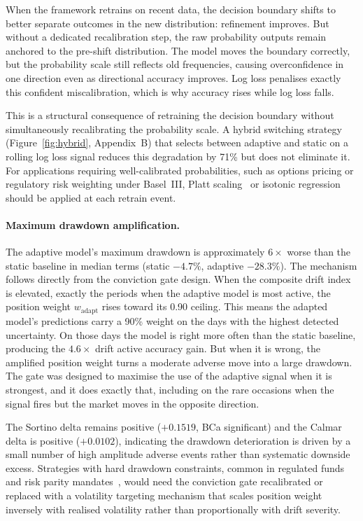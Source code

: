 When the framework retrains on recent data, the decision boundary shifts to better separate outcomes in the new distribution: refinement improves. But without a dedicated recalibration step, the raw probability outputs remain anchored to the pre-shift distribution. The model moves the boundary correctly, but the probability scale still reflects old frequencies, causing overconfidence in one direction even as directional accuracy improves. Log loss penalises exactly this confident miscalibration, which is why accuracy rises while log loss falls.

This is a structural consequence of retraining the decision boundary without simultaneously recalibrating the probability scale. A hybrid switching strategy (Figure~\ref{fig:hybrid}, Appendix~B) that selects between adaptive and static on a rolling log loss signal reduces this degradation by 71\% but does not eliminate it. For applications requiring well-calibrated probabilities, such as options pricing or regulatory risk weighting under Basel~III, Platt scaling~\cite{platt1999} or isotonic regression~\cite{niculescumizil2005} should be applied at each retrain event.


\paragraph{Maximum drawdown amplification.}
The adaptive model's maximum drawdown is approximately $6\times$ worse than the static baseline in median terms (static $-4.7\%$, adaptive $-28.3\%$). The mechanism follows directly from the conviction gate design. When the composite drift index is elevated, exactly the periods when the adaptive model is most active, the position weight $w_{\text{adapt}}$ rises toward its 0.90 ceiling. This means the adapted model's predictions carry a 90\% weight on the days with the highest detected uncertainty. On those days the model is right more often than the static baseline, producing the $4.6\times$ drift active accuracy gain. But when it is wrong, the amplified position weight turns a moderate adverse move into a large drawdown. The gate was designed to maximise the use of the adaptive signal when it is strongest, and it does exactly that, including on the rare occasions when the signal fires but the market moves in the opposite direction.

The Sortino delta remains positive ($+0.1519$, BCa significant) and the Calmar delta is positive ($+0.0102$), indicating the drawdown deterioration is driven by a small number of high amplitude adverse events rather than systematic downside excess. Strategies with hard drawdown constraints, common in regulated funds and risk parity mandates~\cite{rockafellar2000}, would need the conviction gate recalibrated or replaced with a volatility targeting mechanism that scales position weight inversely with realised volatility rather than proportionally with drift severity.

